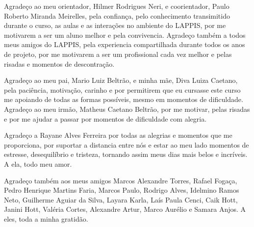 \begin{agradecimentos}

    Agradeço ao meu orientador, Hilmer Rodrigues Neri, e coorientador, Paulo Roberto Miranda Meirelles, pela confiança, pelo conhecimento transimitido durante o curso, as aulas e as interações no ambiente do LAPPIS, por me motivarem a ser um aluno melhor e pela convivencia. Agradeço também a todos meus amigos do LAPPIS, pela experiencia compartilhada durante todos os anos de projeto, por me motivarem a ser um profissional cada vez melhor e pelas risadas e momentos de descontração.

        Agradeço ao meu pai, Mario Luiz Beltrão, e minha mãe, Diva Luiza Caetano, pela paciência, motivação, carinho e por permitirem que eu cursasse este curso me apoiando de todas as formas possíveis, mesmo em momentos de dificuldade. Agradeço ao meu irmão, Matheus Caetano Beltrão, por me motivar, pelas risadas e por me ajudar a passar por momentos de dificuldade com alegria.

        Agradeço a Rayane Alves Ferreira por todas as alegrias e momentos que me proporciona, por suportar a distancia entre nós e estar ao meu lado momentos de estresse, desequilíbrio e tristeza, tornando assim meus dias mais belos e incríveis. A ela, todo meu amor.

        Agradeço também aos meus amigos Marcos Alexandre Torres, Rafael Fogaça, Pedro Henrique Martins Faria, Marcos Paulo, Rodrigo Alves, Idelmino Ramos Neto, Guilherme Aguiar da Silva, Layara Karla, Laís Paula Cenci, Caik Hott, Janini Hott, Valéria Cortes, Alexandre Artur, Marco Aurélio e Samara Anjos. A eles, toda a minha gratidão.
\end{agradecimentos}
